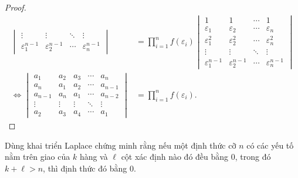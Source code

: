 \documentclass[class=linear-algebra,crop=false]{standalone}
\begin{document}
\begin{proof}
\begin{align*}
\begin{vmatrix}
			\vdots                & \vdots                & \ddots & \vdots                \\
			\varepsilon_{1}^{n-1} & \varepsilon_{2}^{n-1} & \cdots & \varepsilon_{n}^{n-1}
		\end{vmatrix}
		 & =
		\prod^{n}_{i=1}f(\varepsilon_{i})
		\begin{vmatrix}
			1                     & 1                     & \cdots & 1                     \\
			\varepsilon_{1}       & \varepsilon_{2}       & \cdots & \varepsilon_{n}       \\
			\varepsilon_{1}^{2}   & \varepsilon_{2}^{2}   & \cdots & \varepsilon_{n}^{2}   \\
			\vdots                & \vdots                & \ddots & \vdots                \\
			\varepsilon_{1}^{n-1} & \varepsilon_{2}^{n-1} & \cdots & \varepsilon_{n}^{n-1}
		\end{vmatrix} \\
		\Leftrightarrow
		\begin{vmatrix}
			a_{1}   & a_{2}  & a_{3}  & \cdots & a_{n}   \\
			a_{n}   & a_{1}  & a_{2}  & \cdots & a_{n-1} \\
			a_{n-1} & a_{n}  & a_{1}  & \cdots & a_{n-2} \\
			\vdots  & \vdots & \vdots & \ddots & \vdots  \\
			a_{2}   & a_{3}  & a_{4}  & \cdots & a_{1}
		\end{vmatrix}
		 & =
		\prod^{n}_{i=1}f(\varepsilon_{i}).
	\end{align*}
\end{proof}

\begin{exercise}
	\par Dùng khai triển Laplace chứng minh rằng nếu một định thức cỡ $n$ có các yếu tố nằm trên giao của $k$ hàng và $\ell$ cột xác định nào đó đều bằng 0, trong đó $k + \ell > n$, thì định thức đó bằng 0.
\end{exercise}
\end{document}
